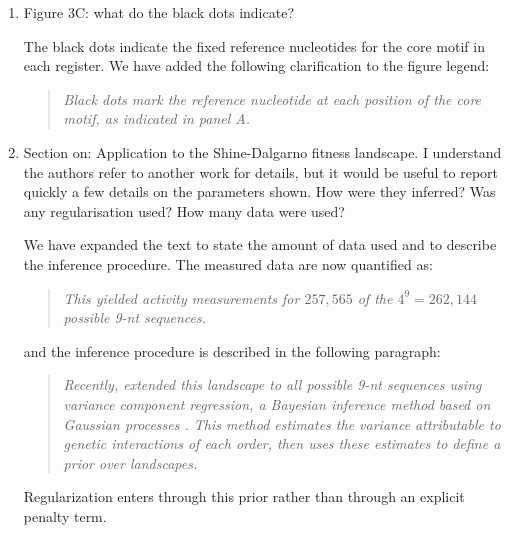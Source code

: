 \documentclass[11pt]{article}
\newenvironment{response}{\par\color{responseblue}}{\par}
\newenvironment{msquote}
  {\begin{quote}\color{responseblue}\itshape\noindent\ignorespaces}
  {\end{quote}}
\begin{document}
\begin{enumerate}
\item Figure 3C: what do the black dots indicate?

\begin{response}
The black dots indicate the fixed reference nucleotides for the core motif in
each register. We have added the following clarification to the figure legend:
\end{response}

\begin{msquote}
Black dots mark the reference nucleotide at each position of the core motif, as
indicated in panel A.
\end{msquote}

\item Section on: Application to the Shine-Dalgarno fitness landscape. I
understand the authors refer to another work for details, but it would be useful
to report quickly a few details on the parameters shown. How were they inferred?
Was any regularisation used? How many data were used?

\begin{response}
We have expanded the text to state the amount of data used and to describe the
inference procedure. The measured data are now quantified as:
\end{response}

\begin{msquote}
This yielded activity measurements for $257{,}565$ of the $4^9 = 262{,}144$
possible 9-nt sequences.
\end{msquote}

\begin{response}
and the inference procedure is described in the following paragraph:
\end{response}

\begin{msquote}
Recently, \citet{MartiGomez2026} extended this landscape to all possible 9-nt sequences using variance component regression, a Bayesian inference method based on Gaussian processes \citep{Zhou2022}. This method estimates the variance attributable to genetic
interactions of each order, then uses these estimates to define a prior over
landscapes.
\end{msquote}

\begin{response}
Regularization enters through this prior rather than through an explicit penalty
term.
\end{response}


\end{enumerate}
\end{document}
